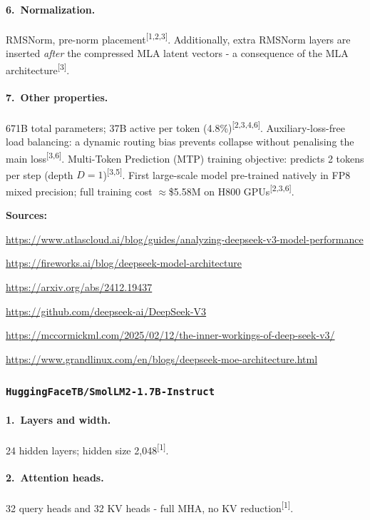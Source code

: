 \documentclass[11pt, a4paper]{article}
\newcommand{\src}[1]{\textsuperscript{\normalfont\small[#1]}}
\begin{document}
\paragraph{6.~Normalization.}
RMSNorm, pre-norm placement\src{1,2,3}.
Additionally, extra RMSNorm layers are inserted \emph{after} the compressed MLA
latent vectors - a consequence of the MLA architecture\src{3}.

\paragraph{7.~Other properties.}
671B total parameters; 37B active per token (4.8\%)\src{2,3,4,6}.
Auxiliary-loss-free load balancing: a dynamic routing bias prevents collapse
without penalising the main loss\src{3,6}.
Multi-Token Prediction (MTP) training objective: predicts 2 tokens per step
(depth $D=1$)\src{3,5}.
First large-scale model pre-trained natively in FP8 mixed precision;
full training cost $\approx$\$5.58M on H800 GPUs\src{2,3,6}.

\noindent\textbf{Sources:}
\begin{enumerate}[noitemsep,label=\small{[\arabic*]},leftmargin=*,topsep=2pt]
\item \small\url{https://www.atlascloud.ai/blog/guides/analyzing-deepseek-v3-model-performance}
\item \small\url{https://fireworks.ai/blog/deepseek-model-architecture}
\item \small\url{https://arxiv.org/abs/2412.19437}
\item \small\url{https://github.com/deepseek-ai/DeepSeek-V3}
\item \small\url{https://mccormickml.com/2025/02/12/the-inner-workings-of-deep-seek-v3/}
\item \small\url{https://www.grandlinux.com/en/blogs/deepseek-moe-architecture.html}
\end{enumerate}

\subsubsection{\texttt{HuggingFaceTB/SmolLM2-1.7B-Instruct}}

\paragraph{1.~Layers and width.}
24 hidden layers; hidden size 2,048\src{1}.

\paragraph{2.~Attention heads.}
32 query heads and 32 KV heads - full MHA, no KV reduction\src{1}.
\end{document}
